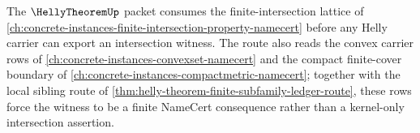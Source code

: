 The $\HellyTheoremUp$ packet consumes the finite-intersection lattice of \autoref{ch:concrete-instances-finite-intersection-property-namecert} before any Helly carrier can export an intersection witness. The route also reads the convex carrier rows of \autoref{ch:concrete-instances-convexset-namecert} and the compact finite-cover boundary of \autoref{ch:concrete-instances-compactmetric-namecert}; together with the local sibling route of \autoref{thm:helly-theorem-finite-subfamily-ledger-route}, these rows force the witness to be a finite NameCert consequence rather than a kernel-only intersection assertion.
